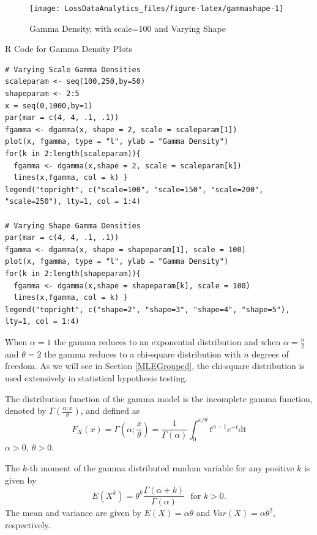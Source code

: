 \documentclass[]{book}
\begin{document}
\begin{figure}

{\centering \texttt{[image: LossDataAnalytics\_files/figure-latex/gammashape-1]} 

}

\caption{Gamma Density, with scale=100 and Varying Shape}\label{fig:gammashape}
\end{figure}

R Code for Gamma Density Plots

\hypertarget{display.gammascale.2}{}
\begin{verbatim}
# Varying Scale Gamma Densities
scaleparam <- seq(100,250,by=50)
shapeparam <- 2:5
x = seq(0,1000,by=1)
par(mar = c(4, 4, .1, .1))
fgamma <- dgamma(x, shape = 2, scale = scaleparam[1])
plot(x, fgamma, type = "l", ylab = "Gamma Density")
for(k in 2:length(scaleparam)){
  fgamma <- dgamma(x,shape = 2, scale = scaleparam[k])
  lines(x,fgamma, col = k) }
legend("topright", c("scale=100", "scale=150", "scale=200", "scale=250"), lty=1, col = 1:4)

# Varying Shape Gamma Densities
par(mar = c(4, 4, .1, .1))
fgamma <- dgamma(x, shape = shapeparam[1], scale = 100)
plot(x, fgamma, type = "l", ylab = "Gamma Density")
for(k in 2:length(shapeparam)){
  fgamma <- dgamma(x,shape = shapeparam[k], scale = 100)
  lines(x,fgamma, col = k) }
legend("topright", c("shape=2", "shape=3", "shape=4", "shape=5"), lty=1, col = 1:4)
\end{verbatim}

When \(\alpha = 1\) the gamma reduces to an exponential distribution and
when \(\alpha = \frac{n}{2}\) and \(\theta = 2\) the gamma reduces to a
chi-square distribution with \(n\) degrees of freedom. As we will see in
Section \ref{MLEGrouped}, the chi-square distribution is used
extensively in statistical hypothesis testing.

The distribution function of the gamma model is the incomplete gamma
function, denoted by \(\Gamma\left( \frac{\alpha;x}{\theta} \right)\),
and defined as
\[F_{X}\left( x \right) = \Gamma\left( \alpha; \frac{x}{\theta} \right) = \frac{1}{\Gamma\left( \alpha \right)}\int_{0}^{x /\theta}t^{\alpha - 1}e^{- t}\text{dt}\]
\(\alpha > 0,\ \theta > 0\).

The \(k\)-th moment of the gamma distributed random variable for any
positive \(k\) is given by
\[E\left( X^{k} \right) = \theta^{k} \frac{\Gamma\left( \alpha + k \right)}{\Gamma\left( \alpha \right)}  \ \ \ \text{for } k > 0 .\]
The mean and variance are given by \(E\left( X \right) = \alpha\theta\)
and \(Var\left( X \right) = \alpha\theta^{2}\), respectively.
\end{document}
